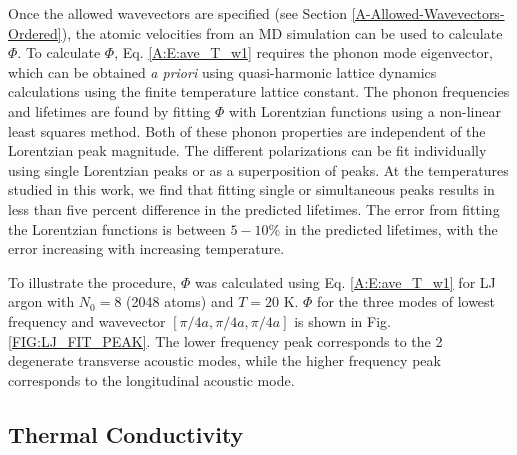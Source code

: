 \documentclass[letterpaper,12pt]{article}
\begin{document}
Once the allowed wavevectors are specified (see Section \ref{A-Allowed-Wavevectors-Ordered}), the atomic velocities from an MD simulation can be used to calculate $\Phi$. To calculate $\Phi$, Eq$.$ \eqref{A:E:ave_T_w1} requires the phonon mode eigenvector, which can be obtained {\em a priori} using quasi-harmonic lattice dynamics calculations using the finite temperature lattice constant.\cite{mcgaughey2006b} The phonon frequencies and lifetimes are found by fitting $\Phi$ with Lorentzian functions using a non-linear least squares method.  Both of these phonon properties are independent of the Lorentzian peak magnitude. The different polarizations can be fit individually using single Lorentzian peaks or as a superposition of peaks. At the temperatures studied in this work, we find that fitting single or simultaneous peaks results in less than five percent difference in the predicted lifetimes. The error from fitting the Lorentzian functions is between $5-10\%$ in the predicted lifetimes, with the error increasing with increasing temperature.\footnotemark  

To illustrate the procedure, $\Phi$ was calculated using Eq$.$ \eqref{A:E:ave_T_w1} for LJ argon with $N_0=8$ (2048 atoms) and $T=20$ K. $\Phi$ for the three modes of lowest frequency and wavevector $[\pi/4a,\pi/4a,\pi/4a]$ is shown in Fig$.$ \ref{FIG:LJ_FIT_PEAK}. The lower frequency peak corresponds to the 2 degenerate transverse acoustic modes, while the higher frequency peak corresponds to the longitudinal acoustic mode.\cite{dove1993}

\subsection{\label{A-Thermal-Cond}Thermal Conductivity}
\end{document}
